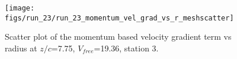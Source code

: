 \begin{figure}[H]
\centering
\texttt{[image: figs/run\_23/run\_23\_momentum\_vel\_grad\_vs\_r\_meshscatter]}
\caption{Scatter plot of the momentum based velocity gradient term vs radius at $z/c$=7.75, $V_{free}$=19.36, station 3.}
\label{fig:run_23_momentum_vel_grad_vs_r_meshscatter}
\end{figure}


